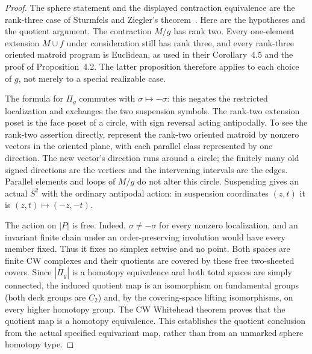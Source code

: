 \documentclass[11pt]{article}
\theoremstyle{definition}\newtheorem{definition}[theorem]{Definition}
\begin{document}
\begin{proof}
The sphere statement and the displayed contraction equivalence are the rank-three case of Sturmfels and Ziegler's theorem~\cite[Theorem~1.2, p.~25; Proposition~4.2, pp.~37--38; Corollary~4.5, p.~40]{SZ1993}. Here are the hypotheses and the quotient argument. The contraction $M/g$ has rank two. Every
one-element extension $M\cup f$ under consideration still has rank three,
and every rank-three oriented matroid program is Euclidean, as used in their
Corollary~4.5 and the proof of Proposition~4.2. The latter proposition therefore
applies to each choice of $g$, not merely to a special realizable case.

The formula for $\Pi_g$ commutes with $\sigma\mapsto-\sigma$: this negates the
restricted localization and exchanges the two suspension symbols. The
rank-two extension poset is the face poset of a circle, with sign reversal
acting antipodally. To see the rank-two assertion directly, represent the
rank-two oriented matroid by nonzero vectors in the oriented plane, with each
parallel class represented by one direction. The new vector's direction runs
around a circle; the finitely many old signed directions are the vertices
and the intervening intervals are the edges. Parallel elements and loops of
$M/g$ do not alter this circle. Suspending gives an actual $S^2$ with the
ordinary antipodal action: in suspension coordinates $(z,t)$ it is
$(z,t)\mapsto(-z,-t)$.

The action on $|P|$ is free. Indeed, $\sigma\neq-\sigma$ for every nonzero
localization, and an invariant finite chain under an order-preserving
involution would have every member fixed. Thus it fixes no simplex setwise
and no point. Both spaces are finite CW complexes and their quotients are
covered by these free two-sheeted covers. Since $|\Pi_g|$ is a homotopy
equivalence and both total spaces are simply connected, the induced quotient
map is an isomorphism on fundamental groups (both deck groups are $C_2$) and,
by the covering-space lifting isomorphisms, on every higher homotopy group.
The CW Whitehead theorem proves that the quotient map is a homotopy
equivalence. This establishes the quotient conclusion from the actual
specified equivariant map, rather than from an unmarked sphere homotopy type.
\end{proof}
\end{document}
